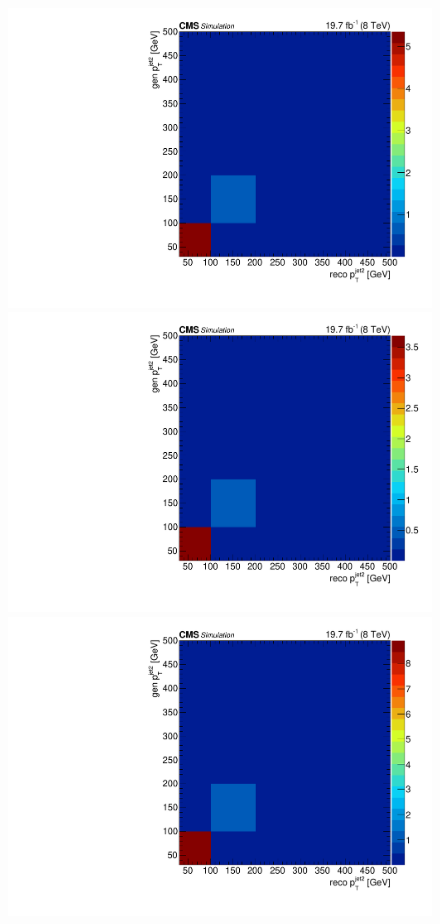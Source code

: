 \begin{figure}[hbtp]
  \begin{center}
    \includegraphics[width=\cmsFigWidth]{Figures/ResMat_qqggJJ_PtJet2_ZZTo4m_st_01_fr_Mad}
    \includegraphics[width=\cmsFigWidth]{Figures/ResMat_qqggJJ_PtJet2_ZZTo4e_st_01_fr_Mad}
    \includegraphics[width=\cmsFigWidth]{Figures/ResMat_qqggJJ_PtJet2_ZZTo2e2m_st_01_fr_Mad}     

\end{center}
\end{figure}
